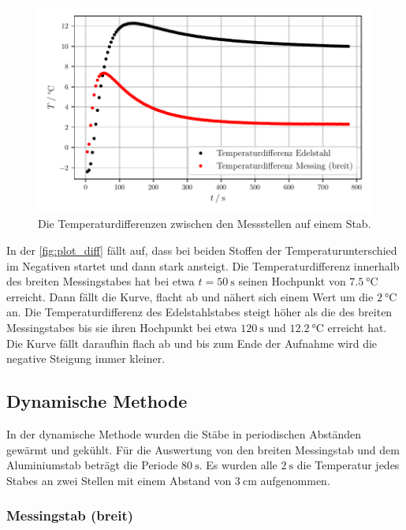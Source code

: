 \begin{figure}[H]
  \centering
  \includegraphics{build/plot_diff.pdf}
  \caption{Die Temperaturdifferenzen zwischen den Messstellen auf einem Stab.}
  \label{fig:plot_diff}
\end{figure}
In der \autoref{fig:plot_diff} fällt auf, dass bei beiden Stoffen der Temperaturunterschied im Negativen startet und dann stark ansteigt.
Die Temperaturdifferenz innerhalb des breiten Messingstabes hat bei etwa $ t = \SI{50}{\second}$ seinen Hochpunkt von $\SI{7.5}{\celsius}$ erreicht.
Dann fällt die Kurve, flacht ab und nähert sich einem Wert um die $\SI{2}{\celsius}$ an.
Die Temperaturdifferenz des Edelstahlstabes steigt höher als die des breiten Messingstabes bis sie ihren Hochpunkt bei etwa $\SI{120}{\second} $ und $\SI{12.2}{\celsius}$ erreicht hat.
Die Kurve fällt daraufhin flach ab und bis zum Ende der Aufnahme wird die negative Steigung immer kleiner.

\subsection{Dynamische Methode}
In der dynamische Methode wurden die Stäbe in periodischen Abständen gewärmt und gekühlt. 
Für die Auswertung von den breiten Messingstab und dem Aluminiumstab beträgt die Periode $\SI{80}{\second}$.
Es wurden alle $\SI{2}{\second}$ die Temperatur jedes Stabes an zwei Stellen mit einem Abstand von $\SI{3}{\centi\metre}$ aufgenommen. 


\subsubsection{Messingstab (breit)}


